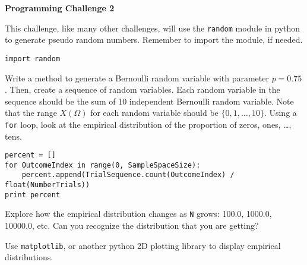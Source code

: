 \documentclass[11pt]{article}
\begin{document}
\begin{center}
{\bfseries \LARGE Programming Challenge 2}
\end{center}

This challenge, like many other challenges, will use the \texttt{random} module in python to generate pseudo random numbers.
Remember to import the module, if needed.
\begin{verbatim}
import random
\end{verbatim}

Write a method to generate a Bernoulli random variable with parameter $p = 0.75$.
Then, create a sequence of random variables.
Each random variable in the sequence should be the sum of 10 independent Bernoulli random variable.
Note that the range $X(\Omega)$ for each random variable should be $\{ 0, 1, \ldots, 10 \}$.
Using a \texttt{for} loop, look at the empirical distribution of the proportion of zeros, ones, \ldots, tens.
\begin{verbatim}
percent = []
for OutcomeIndex in range(0, SampleSpaceSize):
    percent.append(TrialSequence.count(OutcomeIndex) / float(NumberTrials))
print percent
\end{verbatim}
Explore how the empirical distribution changes as \texttt{N} grows: 100.0, 1000.0, 10000.0, etc.
Can you recognize the distribution that you are getting?

Use \texttt{matplotlib}, or another python 2D plotting library to display empirical distributions.
\end{document}
